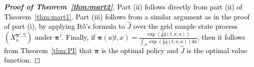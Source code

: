 \documentclass[11pt]{article}
\newcommand{\1}{\mathbbm{1}}
\newcommand{\rev}[1]{\textcolor{black}{{#1}}} %
\begin{document}
\begin{proof}[\bf Proof of Theorem~\ref{thm:mart2}]
\rev{Part (ii) follows directly from part (ii) of Theorem~\ref{thm:mart1}. Part (iii) follows from a similar argument as in the proof of part (i), by applying It\^{o}'s formula to $\hat J$ over the grid sample state process $(X_s^{ \boldsymbol{\pi}', \mathbb{S}})$ under $\boldsymbol{\pi}'$. Finally,
if $\boldsymbol{\pi}(a|t,x) = \frac{\exp(\frac{1}{\theta} \hat q(t,x,a))} {\int_{\mathcal{A} } {\exp(\frac{1}{\theta} \hat q(t,x,a)) da}}$, then it follows from Theorem~\ref{thm:PI} that $\boldsymbol{\pi}$ is the optimal policy and $\hat J$ is the optimal value function.}

\end{proof}
\end{document}
